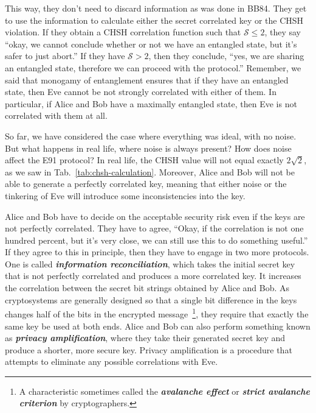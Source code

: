This way, they don't need to discard information as was done in BB84. They get to use the information to calculate either the secret correlated key or the CHSH violation.
If they obtain a CHSH correlation function such that $\mathcal{S} \leq 2$, they say ``okay, we cannot conclude whether or not we have an entangled state, but it's safer to just abort.''
If they have $\mathcal{S} > 2$, then they conclude, ``yes, we are sharing an entangled state, therefore we can proceed with the protocol.''
Remember, we said that monogamy of entanglement ensures that if they have an entangled state, then Eve cannot be not strongly correlated with either of them.
In particular, if Alice and Bob have a maximally entangled state, then Eve is not correlated with them at all.

So far, we have considered the case where everything was ideal, with no noise.
But what happens in real life, where noise is always present? How does noise affect the E91 protocol?
In real life, the CHSH value will not equal exactly $2\sqrt{2}$, as we saw in Tab.~\ref{tab:chsh-calculation}.
Moreover, Alice and Bob will not be able to generate a perfectly correlated key, meaning that either noise or the tinkering of Eve will introduce some inconsistencies into the key.

Alice and Bob have to decide on the acceptable security risk even if the keys are not perfectly correlated.
They have to agree, ``Okay, if the correlation is not one hundred percent, but it's very close, we can still use this to do something useful.''
If they agree to this in principle, then they have to engage in two more protocols.
One is called  \textbf{\emph{information reconciliation}}, which takes the initial secret key that is not perfectly correlated and produces a more correlated key.
It increases the correlation between the secret bit strings obtained by Alice and Bob.
As cryptosystems are generally designed so that a single bit difference in the keys changes half of the bits in the encrypted message~\footnote{A characteristic sometimes called the \textbf{\emph{avalanche effect}} or \textbf{\emph{strict avalanche criterion}} by cryptographers.}, they require that exactly the same key be used at both ends.
Alice and Bob can also perform something known as \textbf{\emph{privacy amplification}}, where they take their generated secret key and produce a shorter, more secure key.
Privacy amplification is a procedure that attempts to eliminate any possible correlations with Eve.

